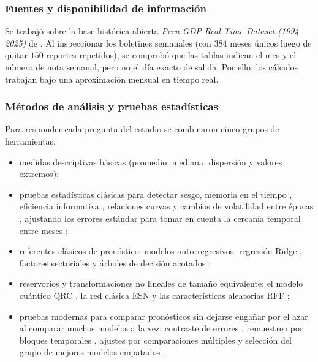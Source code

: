 \subsubsection{Fuentes y disponibilidad de información}

Se trabajó sobre la base histórica abierta \emph{Peru GDP Real-Time Dataset (1994--2025)} de \textcite{cruz2025}. Al inspeccionar los boletines semanales (con \(384\) meses únicos luego de quitar \(150\) reportes repetidos), se comprobó que las tablas indican el mes y el número de nota semanal, pero no el día exacto de salida. Por ello, los cálculos trabajan bajo una aproximación mensual en tiempo real.

\subsubsection{Métodos de análisis y pruebas estadísticas}

Para responder cada pregunta del estudio se combinaron cinco grupos de herramientas:
\begin{itemize}
	\item medidas descriptivas básicas (promedio, mediana, dispersión y valores extremos);
	\item pruebas estadísticas clásicas para detectar sesgo, memoria en el tiempo \parencite{ljung1978}, eficiencia informativa \parencite{mincer1969}, relaciones curvas \parencite{ramsey1969} y cambios de volatilidad entre épocas \parencite{engle1982}, ajustando los errores estándar para tomar en cuenta la cercanía temporal entre meses \parencite{newey1987};
	\item referentes clásicos de pronóstico: modelos autorregresivos, regresión Ridge \parencite{hoerl1970}, factores sectoriales \parencite{stock2002} y árboles de decisión acotados \parencite{friedman2001,chen2016};
	\item reservorios y transformaciones no lineales de tamaño equivalente: el modelo cuántico QRC \parencite{fujii2017}, la red clásica ESN \parencite{jaeger2001} y las características aleatorias RFF \parencite{rahimi2007};
	\item pruebas modernas para comparar pronósticos sin dejarse engañar por el azar al comparar muchos modelos a la vez: contraste de errores \parencite{diebold1995,harvey1997,clark2007}, remuestreo por bloques temporales \parencite{politis1992}, ajustes por comparaciones múltiples \parencite{holm1979,benjamini1995} y selección del grupo de mejores modelos empatados \parencite{hansen2011}.
\end{itemize}

